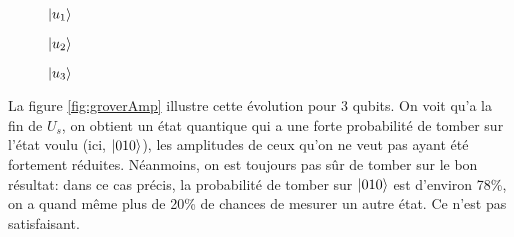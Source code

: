 \begin{figure*}[h]
  \centering
  \begin{subfigure}[t]{0.33\textwidth}
      \centering
      \caption{$\ket{u_1}$}
  \end{subfigure}%
  \begin{subfigure}[t]{0.33\textwidth}
      \centering
      \caption{$\ket{u_2}$}
  \end{subfigure}
  \begin{subfigure}[t]{0.33\textwidth}
    \centering
    \caption{$\ket{u_3}$}
  \end{subfigure}
  \caption{Evolution des amplitudes pour $n=3$ qubits}
  \label{fig:groverAmp}
\end{figure*}

La figure \ref{fig:groverAmp} illustre cette évolution pour 3 qubits. On voit qu'a la fin de $U_s$, on obtient un état quantique qui a une forte probabilité de tomber sur l'état voulu (ici, $\ket{010}$), les amplitudes de ceux qu'on ne veut pas ayant été fortement réduites. Néanmoins, on est toujours pas sûr de tomber sur le bon résultat: dans ce cas précis, la probabilité de tomber sur $\ket{010}$ est d'environ 78\%, on a quand même plus de 20\% de chances de mesurer un autre état. Ce n'est pas satisfaisant.

